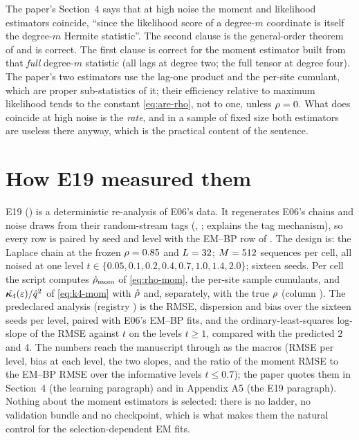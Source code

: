 \begin{remark}
\label{rem:coincide}
The paper's Section~4 says that at high noise the moment and likelihood estimators
coincide, ``since the likelihood score of a degree-$m$ coordinate is itself the
degree-$m$ Hermite statistic''. The second clause is the general-order theorem of
 and is correct. The first clause is correct for the
moment estimator built from that \emph{full} degree-$m$ statistic (all lags at degree
two; the full tensor at degree four). The paper's two estimators use the lag-one
product and the per-site cumulant, which are proper sub-statistics of it; their
efficiency relative to maximum likelihood tends to the constant \cref{eq:are-rho},
not to one, unless $\rho=0$. What does coincide at high noise is the \emph{rate}, and
in a sample of fixed size both estimators are useless there anyway, which is the
practical content of the sentence.
\end{remark}

\section{How E19 measured them}
\label{sec:e19}

E19 () is a deterministic re-analysis of
E06's data. It regenerates E06's chains and noise draws from their random-stream tags
(, ;  explains the tag mechanism), so
every row is paired by seed and level with the EM--BP row of
. The design is: the Laplace chain at the frozen
$\rho=0.85$ and $L=32$; $M=512$ sequences per cell, all noised at one level
$t\in\{0.05,0.1,0.2,0.4,0.7,1.0,1.4,2.0\}$; sixteen seeds. Per cell the script computes
$\hat{\rho}_{\mathrm{mom}}$ of \cref{eq:rho-mom}, the per-site sample cumulants, and
$\hat{\bm{\kappa}_4}(\varepsilon)/\hat{q}^2$ of \cref{eq:k4-mom} with $\hat{\rho}$ and,
separately, with the true $\rho$ (column ). The
predeclared analysis (registry ) is the RMSE,
dispersion and bias over the sixteen seeds per level, paired with E06's EM--BP fits, and
the ordinary-least-squares log-slope of the RMSE against $t$ on the levels $t\ge1$,
compared with the predicted $2$ and $4$. The numbers reach the manuscript through
 as the macros  (RMSE per level,
bias at each level, the two slopes, and the ratio of the moment RMSE to the EM--BP RMSE
over the informative levels $t\le0.7$); the paper quotes them in Section~4 (the learning
paragraph) and in Appendix A5 (the E19 paragraph). Nothing about the moment estimators
is selected: there is no ladder, no validation bundle and no checkpoint, which is what
makes them the natural control for the selection-dependent EM fits.

